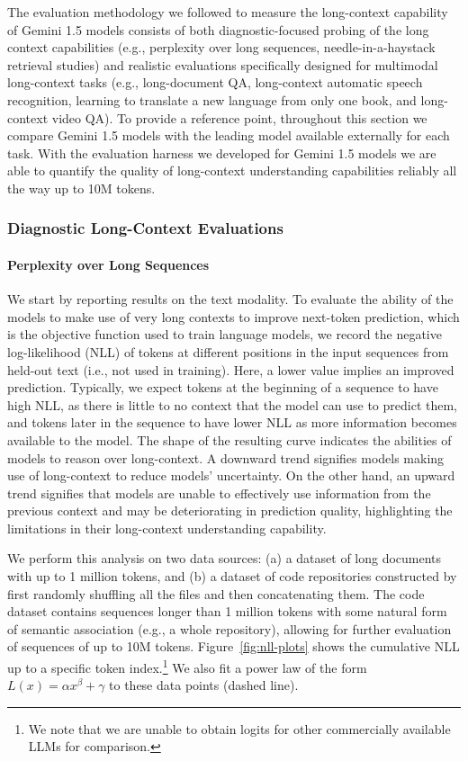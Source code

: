 The evaluation methodology we followed to measure the long-context capability of Gemini 1.5 models consists of both diagnostic-focused probing of the long context capabilities (e.g., perplexity over long sequences, needle-in-a-haystack retrieval studies) and realistic evaluations specifically designed for multimodal long-context tasks (e.g., long-document QA, long-context automatic speech recognition, learning to translate a new language from only one book, and long-context video QA). To provide a reference point, throughout this section we compare Gemini 1.5 models with the leading model available externally for each task. With the evaluation harness we developed for Gemini 1.5 models we are able to quantify the quality of long-context understanding capabilities reliably all the way up to 10M tokens.

\subsubsection{Diagnostic Long-Context Evaluations}
\paragraph{Perplexity over Long Sequences}
\label{sec:long-perplexity}

We start by reporting results on the text modality. To evaluate the ability of the models to make use of very long contexts to improve next-token prediction, which is the objective function used to train language models, we record the negative log-likelihood (NLL) of tokens at different positions in the input sequences from held-out text (i.e., not used in training). Here, a lower value implies an improved prediction. Typically, we expect tokens at the beginning of a sequence  to have high NLL, as there is little to no context that the model can use to predict them, and tokens later in the sequence to have lower NLL as more information becomes available to the model. The shape of the resulting curve indicates the abilities of models to reason over long-context. A downward trend signifies models making use of long-context to reduce models’ uncertainty. On the other hand, an upward trend signifies that models are unable to effectively use information from the previous context and may be deteriorating in prediction quality, highlighting the limitations in their long-context understanding capability.

We perform this analysis on two data sources: (a) a dataset of long documents with up to 1 million tokens, and (b) a dataset of code repositories constructed by first randomly shuffling all the files and then concatenating them. The code dataset contains sequences longer than 1 million tokens with some natural form of semantic association (e.g., a whole repository), allowing for further evaluation of sequences of up to 10M tokens. Figure~\ref{fig:nll-plots} shows the cumulative NLL up to a specific token index.\footnote{We note that we are unable to obtain logits for other commercially available LLMs for comparison.} We also fit a power law of the form $L(x) =\alpha x^\beta + \gamma$ to these data points (dashed line). 

